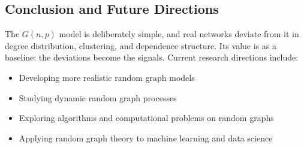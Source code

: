 \subsection{Conclusion and Future Directions}
The $G(n,p)$ model is deliberately simple, and real networks deviate from it in degree distribution, clustering, and dependence structure. Its value is as a baseline: the deviations become the signals. Current research directions include:
\begin{itemize}
\item Developing more realistic random graph models
\item Studying dynamic random graph processes
\item Exploring algorithms and computational problems on random graphs
\item Applying random graph theory to machine learning and data science
\end{itemize}
